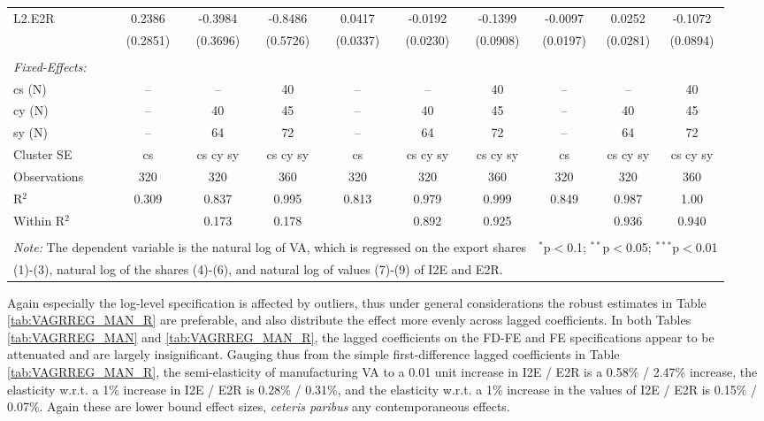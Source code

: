 \documentclass[a4paper]{article}
\begin{document}
\begin{table}[h!]
{\begin{tabular}[t]{lccccccccc}
L2.E2R&0.2386 & -0.3984 & -0.8486 & 0.0417 & -0.0192 & -0.1399 & -0.0097 & 0.0252 & -0.1072\\
  &(0.2851) & (0.3696) & (0.5726) & (0.0337) & (0.0230) & (0.0908) & (0.0197) & (0.0281) & (0.0894)\\\\
\midrule \emph{Fixed-Effects:} &   &   &   &   &   &  \\
cs (N) & -- & -- & 40 & -- & -- & 40 & -- & -- & 40\\
cy (N) & -- & 40 & 45 & -- & 40 & 45 & -- & 40 & 45\\
sy (N) & -- & 64 & 72 & -- & 64 & 72 & -- & 64 & 72\\
\midrule
Cluster SE & cs & cs cy sy & cs cy sy & cs & cs cy sy & cs cy sy & cs & cs cy sy & cs cy sy\\
Observations & 320&320&360&320&320&360&320&320&360\\
R$^2$ & 0.309&0.837&0.995&0.813&0.979&0.999&0.849&0.987&1.00\\
Within R$^2$ & &0.173&0.178&&0.892&0.925&&0.936&0.940\\ \bottomrule \\[-1em]
\multicolumn{7}{l}{\small \textit{Note:} The dependent variable is the natural log of VA, which is regressed on the  export shares}   & \multicolumn{3}{r}{$^{*}$p$<$0.1; $^{**}$p$<$0.05; $^{***}$p$<$0.01} \\ [-0.2em]
\multicolumn{10}{l}{\small \quad \quad \quad (1)-(3), natural log of the shares (4)-(6), and natural log of values (7)-(9) of I2E and E2R.} \\
\end{tabular}
}
\end{table}
\FloatBarrier



Again especially the log-level specification is affected by outliers, thus under general considerations the robust estimates in Table \ref{tab:VAGRREG_MAN_R} are preferable, and also distribute the effect more evenly across lagged coefficients. In both Tables \ref{tab:VAGRREG_MAN} and \ref{tab:VAGRREG_MAN_R}, the lagged coefficients on the FD-FE and FE specifications appear to be attenuated and are largely insignificant. Gauging thus from the simple first-difference lagged coefficients in  Table \ref{tab:VAGRREG_MAN_R}, the semi-elasticity of manufacturing VA to a 0.01 unit increase in I2E / E2R is a 0.58\% / 2.47\% increase, the elasticity w.r.t. a 1\% increase in I2E / E2R is 0.28\% / 0.31\%, and the elasticity w.r.t. a 1\% increase in the values of I2E / E2R is 0.15\% / 0.07\%. Again these are lower bound effect sizes, \textit{ceteris paribus} any contemporaneous effects. \newline
\end{document}
